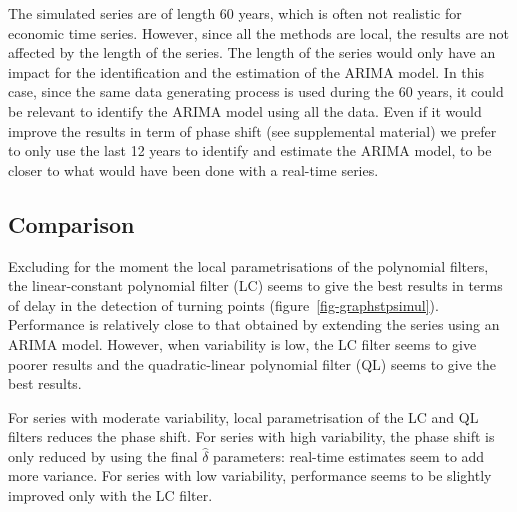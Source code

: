 \documentclass[
]{article}
\newcommand\1{\mathds{1}}
\begin{document}
The simulated series are of length 60 years, which is often not
realistic for economic time series. However, since all the methods are
local, the results are not affected by the length of the series. The
length of the series would only have an impact for the identification
and the estimation of the ARIMA model. In this case, since the same data
generating process is used during the 60 years, it could be relevant to
identify the ARIMA model using all the data. Even if it would improve
the results in term of phase shift (see supplemental material) we prefer
to only use the last 12 years to identify and estimate the ARIMA model,
to be closer to what would have been done with a real-time series.

\subsection{Comparison}\label{comparison}

Excluding for the moment the local parametrisations of the polynomial
filters, the linear-constant polynomial filter (LC) seems to give the
best results in terms of delay in the detection of turning points
(figure~\ref{fig-graphstpsimul}). Performance is relatively close to
that obtained by extending the series using an ARIMA model. However,
when variability is low, the LC filter seems to give poorer results and
the quadratic-linear polynomial filter (QL) seems to give the best
results.

For series with moderate variability, local parametrisation of the LC
and QL filters reduces the phase shift. For series with high
variability, the phase shift is only reduced by using the final
\(\hat\delta\) parameters: real-time estimates seem to add more
variance. For series with low variability, performance seems to be
slightly improved only with the LC filter.
\end{document}
